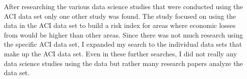 \documentclass[letterpaper]{report}
\begin{document}
		\newpage
		After researching the various data science studies that were conducted using the ACI data set only one other study was found. The study focused on using the data in the ACI data set to build a risk index for areas where economic losses from  would be higher than other areas. Since there was not much research using the specific ACI data set, I expanded my search to the individual data sets that make up the ACI data set. Even in these further searches, I did not really any data science studies using the data but rather many research papers analyze the data set.
		
		
		
		
	
\end{document}
